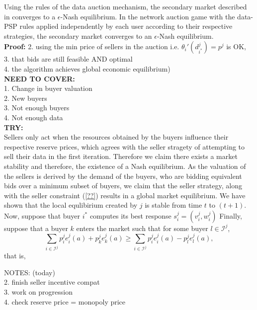 \documentclass[12pt]{article}
\theoremstyle{definition}
\newcommand{\mcI}{\mathcal{I}}
\begin{document}
\begin{multicols}{2}
{
}

{
Using the rules of the data auction mechanism, the secondary market described in
\cite{zheng} converges to a $\epsilon$-Nash equilibrium. In the network auction
game with the data-PSP rules applied independently by each user according to their respective strategies, the secondary market converges to an $\epsilon$-Nash
equilibrium. 
}\\
\textbf{Proof:}
2. using the min price of sellers in the auction i.e. ${\theta_i}'(d_{i^*}^j) =
p^j$ is OK, \\
3. that bids are still feasible AND optimal \\
4. the algorithm achieves global economic equilibrium)\\
\textbf{NEED TO COVER:}\\
1. Change in buyer valuation \\
2. New buyers\\
3. Not enough buyers \\
4. Not enough data\\
\textbf{TRY:}\\
Sellers only act when the resources obtained by the buyers influence their
respective reserve prices, which agrees with the seller stragety of attempting
to sell their data in the first iteration. Therefore we claim there exists a
market stability and therefore, the existence of a Nash equilibrium. As the
valuation of the sellers is derived by the demand of the buyers, who are
bidding equivalent bids over a minimum subset of buyers, we claim that the seller
strategy, along with the seller constraint (\ref{??}) results in a global
market equilibrium.
We have shown that the local
equlibirium created by $j$ is stable from time $t$ to $(t+1)$. 
Now, suppose that buyer $i^*$ computes its best response $s_i^j = (v_i^j, w_i^j)$
Finally, suppose that
a buyer $k$ enters the market such that for some buyer $l\in\mcI^j$,
$$
    \displaystyle\sum_{i\in\mcI^j} p_i^je_i^j(a) + p_k^je_k^j(a) \ge
\sum_{i\in\mcI^j} p_i^je_i^j(a) - p_l^je_l^j(a),
$$
that is,



NOTES: (today)\\
2. finish seller incentive compat\\
3. work on progression\\
4. check reserve price = monopoly price



\end{multicols}
\end{document}
